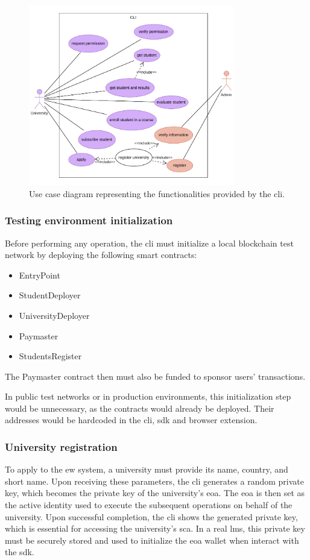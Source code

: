 \begin{figure}
  \centering
  \includegraphics[width=0.8\textwidth]{figures/CLI use case diagram.pdf}
  \caption[\gls{cli} use case diagram]{Use case diagram representing the functionalities provided by the \gls{cli}.}
  \label{fig:useCaseCli}
\end{figure}

\subsubsection{Testing environment initialization}
Before performing any operation, the \gls{cli} must initialize a local blockchain test network by deploying the following smart contracts:
\begin{itemize}
    \item EntryPoint
    \item StudentDeployer
    \item UniversityDeployer
    \item Paymaster
    \item StudentsRegister
\end{itemize}
The Paymaster contract then must also be funded to sponsor users' transactions.

In public test networks or in production environments, this initialization step would be unnecessary, as the contracts would already be deployed. Their addresses would be hardcoded in the \gls{cli}, \gls{sdk} and browser extension.

\subsubsection{University registration}
\label{sssec:applyEw}
To apply to the \gls{ew} system, a university must provide its name, country, and short name. Upon receiving these parameters, the \gls{cli} generates a random private key, which becomes the private key of the university's \gls{eoa}. The \gls{eoa} is then set as the active identity used to execute the subsequent operations on behalf of the university. Upon successful completion, the \gls{cli} shows the generated private key, which is essential for accessing the university's \gls{sca}. In a real \gls{lms}, this private key must be securely stored and used to initialize the \gls{eoa} wallet when interact with the \gls{sdk}. 

